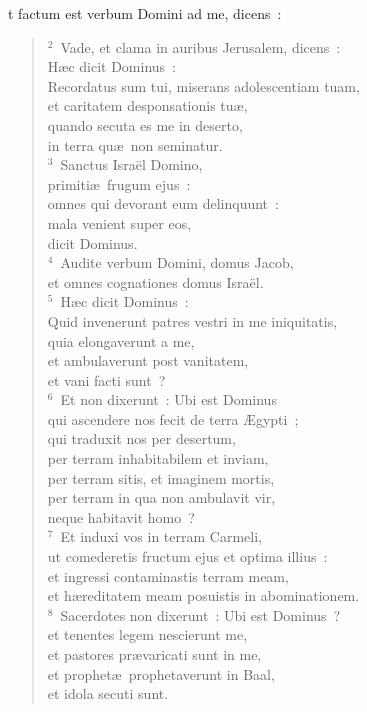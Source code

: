 \bchapter
{}t factum est verbum Domini ad me, dicens~:
\begin{flushleft}\begin{verse}\vspace{6pt}${}^{2}$~Vade, et clama in auribus Jerusalem, dicens~:\\ H\ae c dicit Dominus~:\\ Recordatus sum tui, miserans adolescentiam tuam,\\ et caritatem desponsationis tu\ae ,\\ quando secuta es me in deserto,\\ in terra qu\ae\ non seminatur.\\
${}^{3}$~Sanctus Isra\"el Domino,\\ primiti\ae\ frugum ejus~:\\ omnes qui devorant eum delinquunt~:\\ mala venient super eos,\\ dicit Dominus.\\
${}^{4}$~Audite verbum Domini, domus Jacob,\\ et omnes cognationes domus Isra\"el.\\
${}^{5}$~H\ae c dicit Dominus~:\\ Quid invenerunt patres vestri in me iniquitatis,\\ quia elongaverunt a me,\\ et ambulaverunt post vanitatem,\\ et vani facti sunt~?\\
${}^{6}$~Et non dixerunt~: Ubi est Dominus\\ qui ascendere nos fecit de terra \AE gypti~;\\ qui traduxit nos per desertum,\\ per terram inhabitabilem et inviam,\\ per terram sitis, et imaginem mortis,\\ per terram in qua non ambulavit vir,\\ neque habitavit homo~?\\
${}^{7}$~Et induxi vos in terram Carmeli,\\ ut comederetis fructum ejus et optima illius~:\\ et ingressi contaminastis terram meam,\\ et h\ae reditatem meam posuistis in abominationem.\\
${}^{8}$~Sacerdotes non dixerunt~: Ubi est Dominus~?\\ et tenentes legem nescierunt me,\\ et pastores pr\ae varicati sunt in me,\\ et prophet\ae\ prophetaverunt in Baal,\\ et idola secuti sunt.\\

\end{verse}
\end{flushleft}
